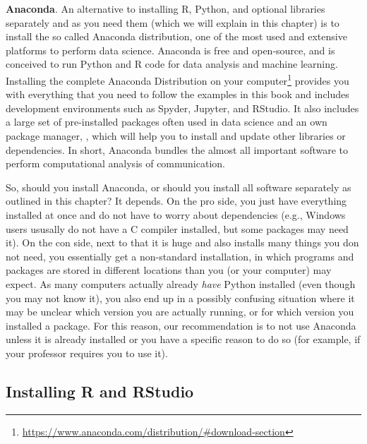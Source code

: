 \begin{feature}\textbf{Anaconda}. An alternative to installing 
  R, Python, and optional libraries separately and as you need them
  (which we will explain in this chapter) is to install the so called
  Anaconda distribution, one of the most used and extensive platforms
  to perform data science. Anaconda is free and open-source, and is
  conceived to run Python and R code for data analysis and machine
  learning. Installing the complete Anaconda Distribution on your
  computer\footnote{\url{https://www.anaconda.com/distribution/\#download-section}}
  provides you with everything that you need to follow the examples in
  this book and includes development environments such as Spyder,
  Jupyter, and RStudio. It also includes a large set of pre-installed
  packages often used in data science and an own package manager,
  , which will help you to install and update other
  libraries or dependencies. In short, Anaconda bundles the almost all
  important software to perform computational analysis of
  communication.

  So, should you install Anaconda, or should you
  install all software separately as outlined in this chapter? It
  depends. On the pro side, you just have everything installed at once and do
  not have to worry about dependencies (e.g., Windows users ususally
  do not have a C compiler installed, but some packages may need
  it). On the con side, next to that it is huge and also installs many
  things you don not need, you essentially get a non-standard
  installation, in which programs and packages are stored in different
  locations than you (or your computer) may expect. As many computers
  actually already \emph{have} Python installed (even though you may
  not know it), you also end up in a possibly confusing situation
  where it may be unclear which version you are actually running, or
  for which version you installed a package.
  For this reason, our recommendation is to not use Anaconda unless
  it is already installed or you have a specific reason to do so
  (for example, if your professor requires you to use it).
\end{feature}

\subsection{Installing R and RStudio}

